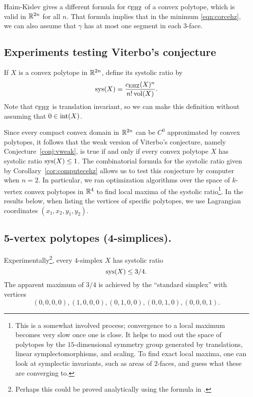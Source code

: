 \begin{remark}
Haim-Kislev \cite[Thm.\ 1.1]{haim-kislev} gives a different formula for $c_{\operatorname{EHZ}}$ of a convex polytope, which is valid in ${\mathbb R}^{2n}$ for all $n$. 
That formula implies that in the minimum \eqref{eqn:corcehz}, we can also assume that $\gamma$ has at most one segment in each $3$-face.
\end{remark}

\subsection{Experiments testing Viterbo's conjecture}

If $X$ is a convex polytope in ${\mathbb R}^{2n}$, define its systolic ratio by
\[
\operatorname{sys}(X) = \frac{c_{\operatorname{EHZ}}(X)^n}{n!\operatorname{vol}(X)}.
\]
Note that $c_{\operatorname{EHZ}}$ is translation invariant, so we can make this definition without assuming that $0\in\operatorname{int}(X)$.

Since every compact convex domain in ${\mathbb R}^{2n}$ can be $C^0$ approximated by convex polytopes, it follows that the weak version of Viterbo's conjecture, namely Conjecture~\ref{conj:vweak}, is true if and only if every convex polytope $X$ has systolic ratio $\operatorname{sys}(X)\le 1$. The combinatorial formula for the systolic ratio given by Corollary~\ref{cor:computecehz} allows us to test this conjecture by computer when $n=2$. In particular, we ran optimization algorithms over the space of $k$-vertex convex polytopes in ${\mathbb R}^4$ to find local maxima of the systolic ratio\footnote{This is a somewhat involved process; convergence to a local maximum becomes very slow once one is close. It helps to mod out the space of polytopes by the $15$-dimensional symmetry group generated by translations, linear symplectomorphisms, and scaling. To find exact local maxima, one can look at symplectic invariants, such as areas of $2$-faces, and guess what these are converging to.}. In the results below, when listing the vertices of specific polytopes, we use Lagrangian coordinates $(x_1,x_2,y_1,y_2)$.

\subsection*{5-vertex polytopes (4-simplices).} Experimentally\footnote{Perhaps this could be proved analytically using the formula in \cite[Thm.\ 1.1]{haim-kislev}.}, every $4$-simplex $X$ has systolic ratio
\[
\operatorname{sys}(X) \le 3/4.
\]
The apparent maximum of $3/4$ is achieved by the ``standard simplex'' with vertices
\[
(0,0,0,0), (1,0,0,0), (0,1,0,0), (0,0,1,0), (0,0,0,1).
\]

